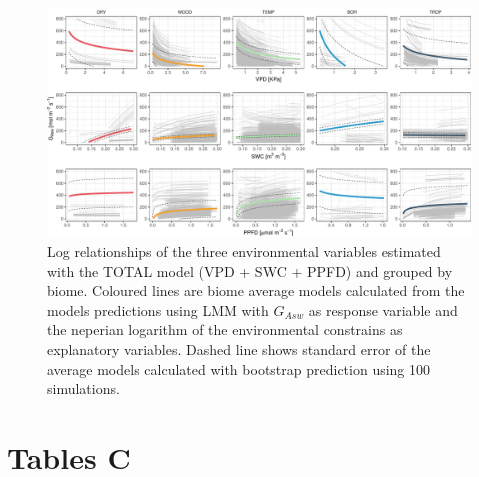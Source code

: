 \documentclass[11pt,twoside]{reedthesis}
\begin{document}
\newpage

\setlength{\abovecaptionskip}{15pt}
\begin{figure}[hbt!]

{\centering \includegraphics[width=1\linewidth]{figure/appendixC/spa_plots} 

}

\caption[Log relationships of the three environmental variables estimated with the TOTAL model (VPD + SWC + PPFD) and grouped by biome.]{Log relationships of the three environmental variables estimated with the TOTAL model (VPD + SWC + PPFD) and grouped by biome. Coloured lines are biome average models calculated from the models predictions using LMM with $G_{Asw}$ as response variable and the neperian logarithm of the environmental constrains as explanatory variables. Dashed line shows standard error of the average models calculated with bootstrap prediction using 100 simulations.}\label{fig:unnamed-chunk-11}
\end{figure}
\setlength{\abovecaptionskip}{0pt} \newpage

\section{Tables C}\label{tables-c}
\end{document}
